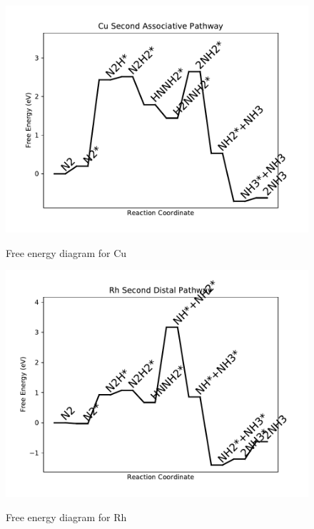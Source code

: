 \documentclass{article}
\begin{document}
\begin{figure}
\includegraphics[width=1\linewidth]{data/plots/Cu_associative_2.pdf}
\label{fig:Cu_associative_2}
\caption{Free energy diagram for Cu}
\end{figure}

\begin{figure}
\includegraphics[width=1\linewidth]{data/plots/Rh_distal_2.pdf}
\label{fig:Rh_distal_2}
\caption{Free energy diagram for Rh}
\end{figure}
\end{document}
